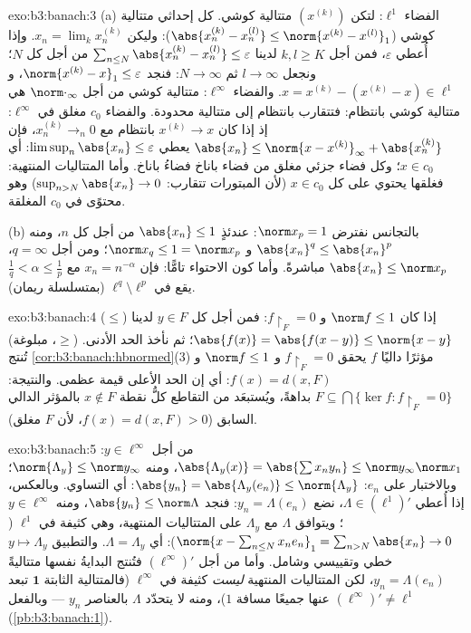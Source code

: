 \begin{solution}{exo:b3:banach:3}
(a) الفضاء $\ell^1$: لتكن $(x^{(k)})$ متتالية كوشي. كل إحداثي
متتالية كوشي ($\abs{x^{(k)}_n - x^{(l)}_n} \leq \norm{x^{(k)} -
x^{(l)}}_1$): وليكن $x_n = \lim_kx^{(k)}_n$. وإذا أُعطي $\varepsilon$،
فمن أجل $k, l \geq K$ لدينا $\sum_{n \leq N}\abs{x^{(k)}_n - x^{(l)}_n}
\leq \varepsilon$ من أجل كل $N$؛ ونجعل
$l \to \infty$ ثم $N \to
\infty$: فنجد $\norm{x^{(k)} - x}_1 \leq \varepsilon$، و $x =
x^{(k)} - (x^{(k)} - x) \in \ell^1$. والفضاء
$\ell^\infty$: متتالية كوشي من أجل $\norm\cdot_\infty$ هي متتالية كوشي
بانتظام: فتتقارب بانتظام إلى متتالية محدودة. والفضاء $c_0$ مغلق
في $\ell^\infty$: إذ إذا كان $x^{(k)} \to x$ بانتظام مع $x^{(k)}_n \to_n 0$،
فإن
$\abs{x_n} \leq \norm{x - x^{(k)}}_\infty + \abs{x^{(k)}_n}$
يعطي $\limsup_n\abs{x_n} \leq \varepsilon$: أي $x \in c_0$؛ وكل فضاء جزئي مغلق من فضاء باناخ
فضاءُ باناخ. وأما المتتاليات المنتهية: فغلقها يحتوي على كل
$x \in c_0$ (لأن المبتورات تتقارب: $\sup_{n>N}\abs{x_n} \to 0$) وهو محتوًى في $c_0$
المغلقة.

(b) بالتجانس نفترض $\norm x_p = 1$: عندئذٍ $\abs{x_n} \leq
1$ من أجل كل
$n$، ومنه $\abs{x_n}^q \leq \abs{x_n}^p$ و $\norm
x_q \leq 1 = \norm x_p$؛ ومن أجل $q = \infty$، $\abs{x_n} \leq
\norm x_p$
مباشرةً. وأما كون الاحتواء تامًّا: فإن $x_n = n^{-\alpha}$ مع $\frac1q < \alpha \leq \frac1p$ يقع في
$\ell^q \setminus
\ell^p$ (بمتسلسلة ريمان).
\end{solution}

\begin{solution}{exo:b3:banach:4}
($\leq$) إذا كان $\norm f \leq 1$ و $f\restriction_F = 0$: فمن أجل كل
$y \in F$ لدينا $\abs{f(x)} = \abs{f(x - y)} \leq \norm{x -
y}$؛ ثم نأخذ الحد الأدنى. ($\geq$، مبلوغة)
تُنتج \cref{cor:b3:banach:hbnormed}(3) مؤثرًا داليًا $f$ يحقق $f\restriction_F = 0$ و
$\norm f \leq 1$ و $f(x) = d(x, F)$: أي إن الحد الأعلى قيمة
عظمى. والنتيجة: $F \subseteq \bigcap\{\ker
f : f\restriction_F = 0\}$ بداهةً، ويُستبعَد من التقاطع كلُّ نقطة
$x \notin F$ بالمؤثر الدالي السابق ($f(x) = d(x,F) > 0$، لأن $F$ مغلق).
\end{solution}

\begin{solution}{exo:b3:banach:5}
من أجل $y \in \ell^\infty$: $\abs{\Lambda_y(x)} =
\abs{\sum x_ny_n} \leq \norm y_\infty\norm x_1$، ومنه $\norm{\Lambda_y} \leq \norm y_\infty$؛ وبالاختبار على $e_n$:
$\abs{y_n} = \abs{\Lambda_y(e_n)} \leq \norm{\Lambda_y}$: أي التساوي. وبالعكس، إذا أُعطي $\Lambda \in (\ell^1)'$، نضع $y_n =
\Lambda(e_n)$:
فنجد $\abs{y_n} \leq \norm\Lambda$، ومنه $y \in
\ell^\infty$؛ ويتوافق $\Lambda$ مع $\Lambda_y$ على
المتتاليات المنتهية، وهي كثيفة في $\ell^1$ ($\norm{x - \sum_{n\leq
N}x_ne_n}_1 = \sum_{n>N}\abs{x_n} \to 0$): أي $\Lambda =
\Lambda_y$.
والتطبيق $y \mapsto \Lambda_y$ خطي وتقييسي وشامل. وأما من أجل $(\ell^\infty)'$
فتُنتج البدايةُ نفسها متتاليةً $y_n = \Lambda(e_n)$، لكن المتتاليات المنتهية
\emph{ليست} كثيفة في $\ell^\infty$ (فالمتتالية الثابتة
$\mathbf 1$ تبعد عنها جميعًا مسافة $1$)، ومنه لا يتحدّد
$\Lambda$ بالعناصر $y_n$ --- وبالفعل $(\ell^\infty)' \neq \ell^1$ (\cref{pb:b3:banach:1}).
\end{solution}

